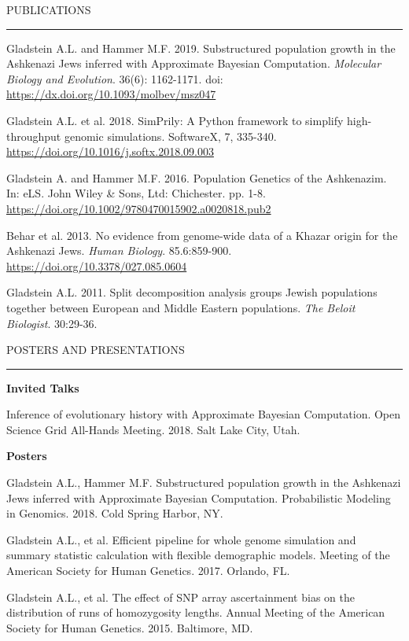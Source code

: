 \documentclass{resume} %
\renewenvironment{rSection}[1]{
\sectionskip
\textcolor{RoyalPurple}{\MakeUppercase{#1}}
\sectionlineskip
\hrule
\begin{list}{}{
\setlength{\leftmargin}{1.5em}
}
\item[]
}{
\end{list}
}
\begin{document}
\begin{rSection}{Publications}

\item Gladstein A.L. and Hammer M.F. 2019. Substructured population growth in the Ashkenazi Jews inferred with Approximate Bayesian Computation. \textit{Molecular Biology and Evolution}. 36(6): 1162-1171. doi: \url{https://dx.doi.org/10.1093/molbev/msz047}
\item Gladstein A.L. et al. 2018. SimPrily: A Python framework to simplify high-throughput genomic simulations. SoftwareX, 7, 335-340. \url{https://doi.org/10.1016/j.softx.2018.09.003}
\item Gladstein A. and Hammer M.F. 2016. Population Genetics of the Ashkenazim. In: eLS. John Wiley \& Sons, Ltd: Chichester. pp. 1-8. \url{https://doi.org/10.1002/9780470015902.a0020818.pub2}
\item Behar et al. 2013. No evidence from genome-wide data of a Khazar origin for the Ashkenazi Jews. \textit{Human Biology}. 85.6:859-900. \url{https://doi.org/10.3378/027.085.0604}
\item Gladstein A.L. 2011. Split decomposition analysis groups Jewish populations together between European and Middle Eastern populations. \textit{The Beloit Biologist}. 30:29-36.

\end{rSection}


\begin{rSection}{Posters and Presentations}

\textbf{Invited Talks}
\item Inference of evolutionary history with Approximate Bayesian Computation. Open Science Grid All-Hands Meeting. 2018. Salt Lake City, Utah.

\item

\textbf{Posters}
\item Gladstein A.L., Hammer M.F. Substructured population growth in the Ashkenazi Jews inferred with Approximate Bayesian Computation. Probabilistic Modeling in Genomics. 2018. Cold Spring Harbor, NY.

\item Gladstein A.L., et al. Efficient pipeline for whole genome simulation and summary statistic calculation with flexible demographic models. Meeting of the American Society for Human Genetics. 2017. Orlando, FL.

\item Gladstein A.L., et al. The effect of SNP array ascertainment bias on the distribution of runs of homozygosity lengths. Annual Meeting of the American Society for Human Genetics. 2015. Baltimore, MD. 


\end{rSection}
\end{document}
